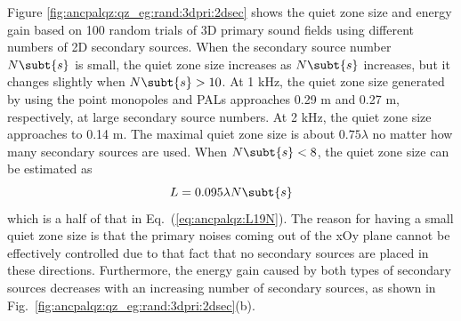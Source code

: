 Figure \ref{fig:ancpalqz:qz_eg:rand:3dpri:2dsec} shows the quiet zone size and energy gain based on 100 random trials of 3D primary sound fields using different numbers of 2D secondary sources. 
When the secondary source number $N\subt{s}$ is small, the quiet zone size increases as $N\subt{s}$ increases, but it changes slightly when $N\subt{s} > 10$. 
At 1 kHz, the quiet zone size generated by using the point monopoles and PALs approaches 0.29 m and 0.27 m, respectively, at large secondary source numbers. 
At 2 kHz, the quiet zone size approaches to 0.14 m. 
The maximal quiet zone size is about $0.75\lambda$ no matter how many secondary sources are used. 
When $N\subt{s} < 8$, the quiet zone size can be estimated as 
\begin{equation}
    L =0.095\lambda N\subt{s}
\end{equation}
which is a half of that in Eq.~(\ref{eq:ancpalqz:L19N}). 
The reason for having a small quiet zone size is that the primary noises coming out of the xOy plane cannot be effectively controlled due to that fact that no secondary sources are placed in these directions. 
Furthermore, the energy gain caused by both types of secondary sources decreases with an increasing number of secondary sources, as shown in Fig.~\ref{fig:ancpalqz:qz_eg:rand:3dpri:2dsec}(b).


